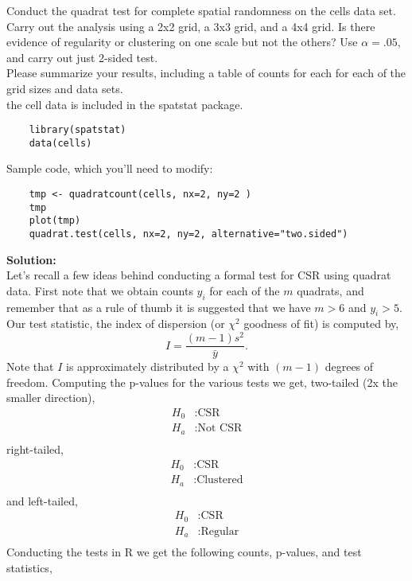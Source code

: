 \documentclass[12pt]{article}
\makeatletter
\theoremstyle{homework}
\newenvironment{exercise}[1]
{\def\@currentlabel{#1}\exercisecore}
{\endexercisecore}
\newcommand{\localhead}[1]{\par\smallskip\noindent\textbf{#1}\nobreak\\}%
\newcommand\solution{\localhead{Solution:}}
\makeatother
\begin{document}
\begin{exercise}{1} Conduct the quadrat test for complete spatial randomness on the cells data set. Carry out the analysis using 
  a 2x2 grid, a 3x3 grid, and a 4x4 grid. Is there evidence of regularity or clustering on one scale but not the others? Use $\alpha = .05$, 
  and carry out just 2-sided test.\\
  Please summarize your results, including a table of counts for each for each of the grid sizes and data sets.\\
  the cell data is included in the spatstat package. 

  \begin{footnotesize}
  \begin{verbatim}
    library(spatstat)
    data(cells)
  \end{verbatim}
  \end{footnotesize}  

  Sample code, which you'll need to modify:

  \begin{footnotesize}
  \begin{verbatim}
    tmp <- quadratcount(cells, nx=2, ny=2 )
    tmp
    plot(tmp)
    quadrat.test(cells, nx=2, ny=2, alternative="two.sided")
  \end{verbatim}
  \end{footnotesize}  
  \solution Let's recall a few ideas behind conducting a formal test for CSR using quadrat data. First note that we obtain counts $y_i$
  for each of the $m$ quadrats, and remember that as a rule of thumb it is suggested that we have $m > 6$ and $y_i > 5$. Our test statistic, the index of dispersion (or $\chi^2$ goodness of fit)
  is computed by,  
  \begin{equation*}
    I = \dfrac{(m-1)s^2}{\bar{y}}. 
  \end{equation*}
  Note that $I$ is approximately distributed by a $\chi^2$ with $(m-1)$ degrees of freedom. Computing the p-values for the various tests we get,
  two-tailed (2x the smaller direction), 
  \begin{align*}
    H_0&: \text{CSR}\\
    H_a&: \text{Not CSR}\\
  \end{align*}
  right-tailed, 
  \begin{align*}
    H_0&: \text{CSR}\\
    H_a&: \text{Clustered}\\
  \end{align*}
  and left-tailed, 
  \begin{align*}
    H_0&: \text{CSR}\\
    H_a&: \text{Regular}\\
  \end{align*}
  Conducting the tests in R we get the following counts, p-values, and test statistics, 


\end{exercise}
\end{document}
